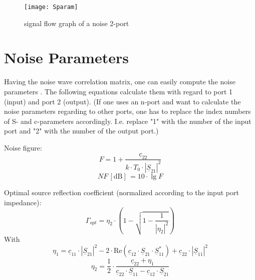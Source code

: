\documentclass[10pt]{report}
\begin{document}
\begin{figure}[ht]
\begin{center}
\texttt{[image: Sparam]}
\end{center}
\caption{signal flow graph of a noise 2-port}
\label{fig:Sparam}
\end{figure}
\FloatBarrier


\section{Noise Parameters}

Having the noise wave correlation matrix, one can easily compute the
noise parameters \cite{Wedge}.  The following equations calculate them
with regard to port 1 (input) and port 2 (output).  (If one uses an
n-port and want to calculate the noise parameters regarding to other
ports, one has to replace the index numbers of S- and c-parameters
accordingly.  I.e. replace "1" with the number of the input port and
"2" with the number of the output port.)

\addvspace{12pt}

Noise figure:
\begin{equation}
F = 1 + \frac{\underline{c}_{22}}{k\cdot T_0\cdot |\underline{S}_{21}|^2}
\label{eq:nparamF}
\end{equation}
\begin{equation}
NF\,[\text{dB}]\, = 10\cdot\lg F
\end{equation}

\addvspace{12pt}

Optimal source reflection coefficient (normalized according to the input
port impedance):
\begin{equation}
\Gamma_{opt} = \eta_2\cdot\left( 1-\sqrt{1-\frac{1}{|\eta_2|^2}} \right)
\end{equation}
With
\begin{equation}
\eta_1 = \underline{c}_{11}\cdot |\underline{S}_{21}|^2
       - 2\cdot \text{Re}\left(\underline{c}_{12}\cdot\underline{S}_{21}\cdot\underline{S}_{11}^*\right)
       + \underline{c}_{22}\cdot|\underline{S}_{11}|^2
\end{equation}
\begin{equation}
\eta_2 = \frac{1}{2}\cdot\frac{\underline{c}_{22} + \eta_1}
              {\underline{c}_{22}\cdot\underline{S}_{11} - \underline{c}_{12}\cdot\underline{S}_{21}}
\end{equation}

\addvspace{12pt}
\end{document}
